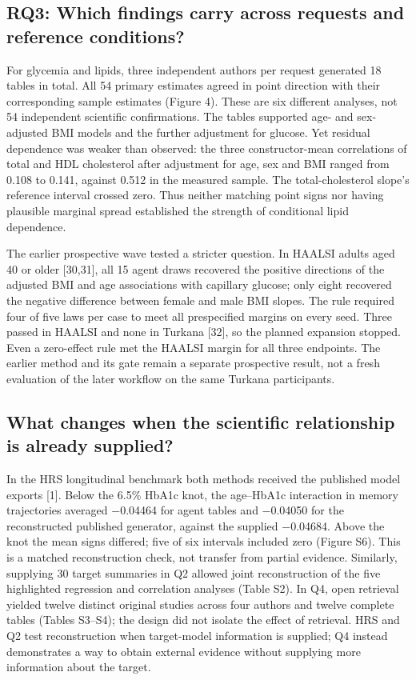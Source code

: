 \documentclass[sigconf,review]{acmart}
\begin{document}
\subsection{RQ3: Which findings carry across requests and reference conditions?}

For glycemia and lipids, three independent authors per request generated 18 tables in total. All 54 primary estimates agreed in point direction with their corresponding sample estimates (Figure 4). These are six different analyses, not 54 independent scientific confirmations. The tables supported age- and sex-adjusted BMI models and the further adjustment for glucose. Yet residual dependence was weaker than observed: the three constructor-mean correlations of total and HDL cholesterol after adjustment for age, sex and BMI ranged from 0.108 to 0.141, against 0.512 in the measured sample. The total-cholesterol slope's reference interval crossed zero. Thus neither matching point signs nor having plausible marginal spread established the strength of conditional lipid dependence.


The earlier prospective wave tested a stricter question. In HAALSI adults aged 40 or older [30,31], all 15 agent draws recovered the positive directions of the adjusted BMI and age associations with capillary glucose; only eight recovered the negative difference between female and male BMI slopes. The rule required four of five laws per case to meet all prespecified margins on every seed. Three passed in HAALSI and none in Turkana [32], so the planned expansion stopped. Even a zero-effect rule met the HAALSI margin for all three endpoints. The earlier method and its gate remain a separate prospective result, not a fresh evaluation of the later workflow on the same Turkana participants.


\subsection{What changes when the scientific relationship is already supplied?}

In the HRS longitudinal benchmark both methods received the published model exports [1]. Below the 6.5\% HbA1c knot, the age–\allowbreak{}HbA1c interaction in memory trajectories averaged −0.04464 for agent tables and −0.04050 for the reconstructed published generator, against the supplied −0.04684. Above the knot the mean signs differed; five of six intervals included zero (Figure S6). This is a matched reconstruction check, not transfer from partial evidence. Similarly, supplying 30 target summaries in Q2 allowed joint reconstruction of the five highlighted regression and correlation analyses (Table S2). In Q4, open retrieval yielded twelve distinct original studies across four authors and twelve complete tables (Tables S3–\allowbreak{}S4); the design did not isolate the effect of retrieval. HRS and Q2 test reconstruction when target-model information is supplied; Q4 instead demonstrates a way to obtain external evidence without supplying more information about the target.
\end{document}
